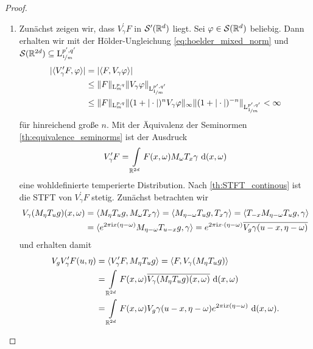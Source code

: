 \begin{proof}
	\begin{enumerate}[label =\textbf{(\roman*)}]
		\item Zunächst zeigen wir, dass $ V_\gamma^\prime F  $ in $ \mathcal{S}^\prime(\mathbb{R}^d) $ liegt.
		Sei $ \varphi \in \mathcal{S}(\mathbb{R}^d) $ beliebig. Dann erhalten wir mit der Hölder-Ungleichung \eqref{eq:hoelder_mixed_norm} und $ \mathcal{S}(\mathbb{R}^{2d}) \subseteq \mathrm{L}^{p^\prime,q^\prime}_{\nicefrac{1}{m}} $
		\begin{align*}
		| \langle V^\prime_\gamma F, \varphi \rangle |
		&=
		| \langle F, V_\gamma \varphi \rangle |\\
		&\leq 
		\| F \|_{\mathrm{L}^{p,q}_m} \| V_\gamma \varphi \|_{\mathrm{L}^{p^\prime, q^\prime}_{\nicefrac{1}{m}}}\\
		&\leq 
		\| F \|_{\mathrm{L}^{p,q}_m} \| (1+ | \cdot |)^n V_\gamma \varphi \|_\infty
		\| (1+|\cdot|)^{-n} \|_{\mathrm{L}^{p^\prime,q^\prime}_{\nicefrac{1}{m}}} < \infty
		\end{align*}
		für hinreichend große $ n $. Mit der Äquivalenz der Seminormen \ref{th:equivalence_seminorms} ist der Ausdruck
		\begin{align*}
		V_\gamma^\prime F
		=
		\int \limits_{\mathbb{R}^{2d}}
		F(x,\omega) M_\omega T_x \gamma \text{ d} (x,\omega)
		\end{align*}
		eine wohldefinierte temperierte Distribution. Nach \ref{th:STFT_continous} ist die STFT von $ V_\gamma^\prime  F$ stetig. Zunächst betrachten wir
		\begin{align*}
		V_\gamma (M_\eta T_u g)(x,\omega)
		&=
		\langle M_\eta T_u g , M_\omega T_x \gamma \rangle 
		= 
		\langle M_{\eta-\omega} T_u g ,T_x \gamma \rangle
		=
		\langle T_{-x} M_{\eta-\omega} T_u g , \gamma \rangle\\
		&=
		\langle e^{2\pi \textrm{i} x(\eta - \omega)} M_{\eta - \omega} T_{u-x} g, \gamma \rangle
		=
		e^{2 \pi \textrm{i} x \cdot (\eta  - \omega)} 
		\overline{V_g \gamma (u-x , \eta - \omega)}
		\end{align*}
		und erhalten damit
		\begin{align*}
		V_g V_\gamma^\prime F(u,\eta)
		&=
		\langle V_\gamma^\prime F, M_\eta T_u g \rangle
		=
		\langle  F,V_\gamma (M_\eta T_u g) \rangle\\
		&=
		\int \limits_{\mathbb{R}^{2d}} F(x,\omega)
		\overline{V_\gamma(M_\eta T_u g)(x,\omega)} \text{ d} (x,\omega)\\
		&=
		\int \limits_{\mathbb{R}^{2d}} F(x,\omega) 
		V_g \gamma (u - x, \eta - \omega) e^{2\pi \textrm{i} x(\eta - \omega)} \text{ d} (x,\omega).
		\end{align*}

\end{enumerate}
\end{proof}
